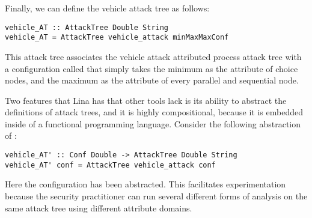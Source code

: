 Finally, we can define the vehicle attack tree as follows:
\begin{verbatim}
vehicle_AT :: AttackTree Double String
vehicle_AT = AttackTree vehicle_attack minMaxMaxConf
\end{verbatim}
This attack tree associates the vehicle attack attributed process
attack tree with a configuration called  that simply
takes the minimum as the attribute of choice nodes, and the maximum as
the attribute of every parallel and sequential node.

Two features that Lina has that other tools lack is its ability to
abstract the definitions of attack trees, and it is highly
compositional, because it is embedded inside of a functional
programming language.  Consider the following abstraction of
:
\begin{verbatim}
vehicle_AT' :: Conf Double -> AttackTree Double String
vehicle_AT' conf = AttackTree vehicle_attack conf
\end{verbatim}
Here the configuration has been abstracted.  This facilitates
experimentation because the security practitioner can run several
different forms of analysis on the same attack tree using different
attribute domains.

